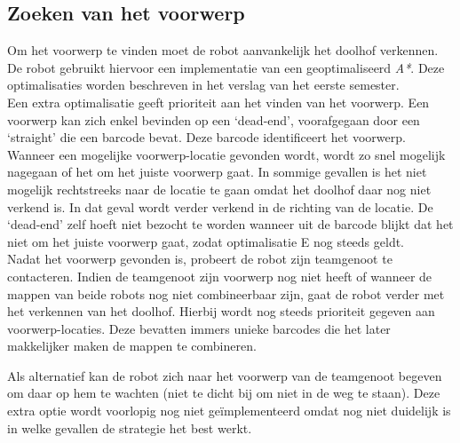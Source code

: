 \documentclass[tt1]{penoverslag}
\begin{document}
\subsection{Zoeken van het voorwerp} %
\label{ssec:algoZoek}
Om het voorwerp te vinden moet de robot aanvankelijk het doolhof verkennen. De robot gebruikt hiervoor een implementatie van een geoptimaliseerd \textit{A*}. Deze optimalisaties worden beschreven in het verslag van het eerste semester.\\

Een extra optimalisatie geeft prioriteit aan het vinden van het voorwerp. Een voorwerp kan zich enkel bevinden op een `dead-end', voorafgegaan door een `straight' die een barcode bevat. Deze barcode identificeert het voorwerp. Wanneer een mogelijke voorwerp-locatie gevonden wordt, wordt zo snel mogelijk nagegaan of het om het juiste voorwerp gaat. In sommige gevallen is het niet mogelijk rechtstreeks naar de locatie te gaan omdat het doolhof daar nog niet verkend is. In dat geval wordt verder verkend in de richting van de locatie. De `dead-end' zelf hoeft niet bezocht te worden wanneer uit de barcode blijkt dat het niet om het juiste voorwerp gaat, zodat optimalisatie E nog steeds geldt.\\

Nadat het voorwerp gevonden is, probeert de robot zijn teamgenoot te contacteren. Indien de teamgenoot zijn voorwerp nog niet heeft of wanneer de mappen van beide robots nog niet combineerbaar zijn, gaat de robot verder met het verkennen van het doolhof. Hierbij wordt nog steeds prioriteit gegeven aan voorwerp-locaties. Deze bevatten immers unieke barcodes die het later makkelijker maken de mappen te combineren.

Als alternatief kan de robot zich naar het voorwerp van de teamgenoot begeven om daar op hem te wachten (niet te dicht bij om niet in de weg te staan). Deze extra optie wordt voorlopig nog niet ge\"implementeerd omdat nog niet duidelijk is in welke gevallen de strategie het best werkt.

\end{document}
